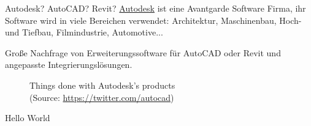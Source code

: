 \begin{frame}{Autodesk? AutoCAD? Revit?}
\href{https://en.wikipedia.org/wiki/Autodesk}{Autodesk} ist eine Avantgarde Software Firma, ihr Software wird in viele Bereichen verwendet: Architektur, Maschinenbau, Hoch- und Tiefbau, Filmindustrie, Automotive...

Große Nachfrage von Erweiterungssoftware für \alert{AutoCAD} oder \alert{Revit} und angepasste Integrierungslösungen.

\begin{figure}
    \centering
    \qquad
    \caption{Things done with Autodesk's products\\
    (Source: \href{https://twitter.com/autocad}{https://twitter.com/autocad})}%
    \label{fig:example}
\end{figure}

\end{frame}

\begin{frame}{Hello World}
    
\end{frame}
